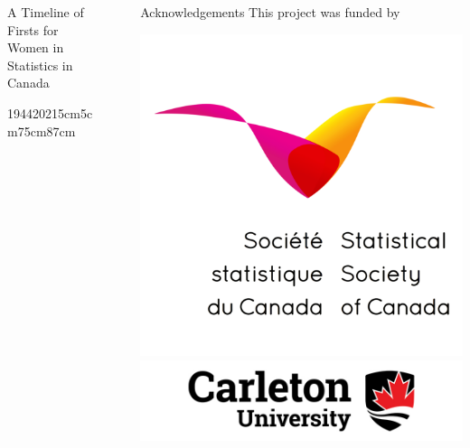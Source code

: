 \documentclass[final]{beamer}
\newlength{\sepwid}
\newlength{\onecolwid}
\newlength{\threecolwid}
\begin{document}
\begin{frame}[t]
\begin{columns}[t]
\begin{column}{\threecolwid}
\begin{block}{A Timeline of Firsts for Women in Statistics in Canada}
\begin{timeline}{1944}{2021}{5cm}{5cm}{75cm}{87cm}
            \end{timeline}
          \end{block}
        \end{column}
        \begin{column}{\sepwid}\end{column}			%
        \begin{column}{\onecolwid}
              \begin{block}{Acknowledgements}
              This project was funded by 
    	        \begin{center}
    			   \includegraphics[width=5in]{SSC.png}
    	           \includegraphics[width=7in]{carleton.jpg}

\end{center}
\end{block}
\end{column}
\end{columns}
\end{frame}
\end{document}
